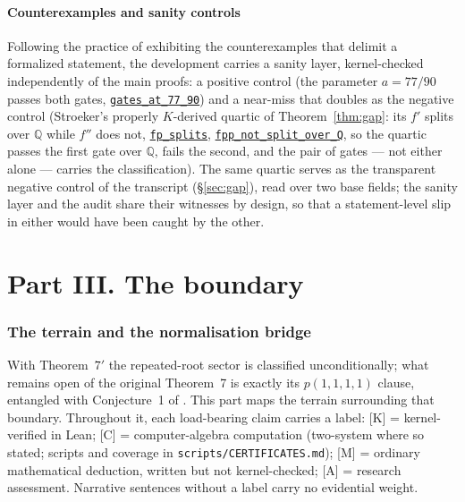 \documentclass[11pt]{amsart}
\newcommand{\Q}{\mathbb{Q}}
\newcommand{\repourl}{https://github.com/hirokifukui/rd-quartics-classification}
\newcommand{\repotag}{v1.1.0}
\newcommand{\leanline}[3]{\href{\repourl/blob/\repotag/#1\#L#2}{\texttt{#3}}}
\begin{document}
\subsection{Counterexamples and sanity controls}
\label{sec:fidelity:sanity}

Following the practice of exhibiting the counterexamples that delimit a
formalized statement, the development carries a sanity
layer, kernel-checked independently of the main proofs: a positive
control (the parameter $a=77/90$ passes both gates,
\leanline{Thm7Prime/Master.lean}{251}{gates\_at\_77\_90}) and a
near-miss that doubles as the negative control (Stroeker's properly
$K$-derived quartic of Theorem~\ref{thm:gap}: its $f'$ splits over
$\Q$ while $f''$ does not,
\leanline{Gap/BMThm7GapK.lean}{142}{fp\_splits},
\leanline{Gap/BMThm7GapK.lean}{148}{fpp\_not\_split\_over\_Q}, so the
quartic passes the first gate over $\Q$, fails the second, and the pair
of gates --- not either alone --- carries the classification).  The same quartic serves as the transparent
negative control of the transcript (\S\ref{sec:gap}), read over two
base fields; the sanity layer and the audit share their witnesses by
design, so that a statement-level slip in either would have been caught
by the other.

\part*{Part III. The boundary}

\section{The terrain and the normalisation bridge}\label{sec:boundary}

With Theorem~$7'$ the repeated-root sector is classified
unconditionally; what remains open of the original Theorem~7 is exactly
its $p(1,1,1,1)$ clause, entangled with Conjecture~1 of \cite{BM2000}.
This part maps the terrain surrounding that boundary.  Throughout it,
each load-bearing claim carries a label: [K] = kernel-verified in Lean;
[C] = computer-algebra computation (two-system where so stated; scripts
and coverage in \texttt{scripts/CERTIFICATES.md}); [M] = ordinary
mathematical deduction, written but not kernel-checked; [A] = research
assessment.  Narrative sentences without a label carry no evidential
weight.
\end{document}
